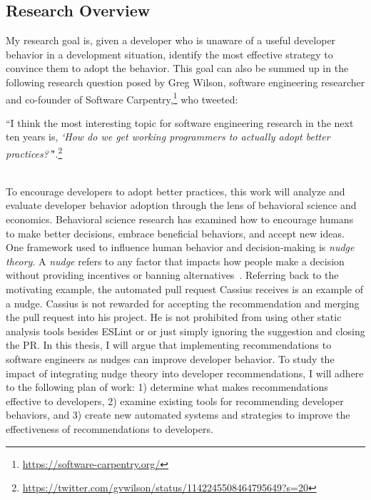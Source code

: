\subsection{Research Overview}

My research goal is, given a developer who is unaware of a useful developer behavior in a development situation, identify the most effective strategy to convince them to adopt the behavior. This goal can also be summed up in the following research question posed by Greg Wilson, software engineering researcher and co-founder of Software Carpentry,\footnote{\url{https://software-carpentry.org/}} who tweeted: \\

\begin{blockquote}
``I think the most interesting topic for software engineering research in the next ten years is, \textit{`How do we get working programmers to actually adopt better practices?'}".\footnote{\url{https://twitter.com/gvwilson/status/1142245508464795649?s=20}}
\end{blockquote} \\

To encourage developers to adopt better practices, this work will analyze and evaluate developer behavior adoption through the lens of behavioral science and economics. Behavioral science research has examined how to encourage humans to make better decisions, embrace beneficial behaviors, and accept new ideas. One framework used to influence human behavior and decision-making is \textit{nudge theory}. A \textit{nudge} refers to any factor that impacts how people make a decision without providing incentives or banning alternatives~\cite{sunstein2008nudge}. Referring back to the motivating example, the automated pull request Cassius receives is an example of a nudge. Cassius is not rewarded for accepting the recommendation and merging the pull request into his project. He is not prohibited from using other static analysis tools besides ESLint or or just simply ignoring the suggestion and closing the PR. In this thesis, I will argue that implementing recommendations to software engineers as nudges can improve developer behavior. To study the impact of integrating nudge theory into developer recommendations, I will adhere to the following plan of work: 1) determine what makes recommendations effective to developers, 2) examine existing tools for recommending developer behaviors, and 3) create new automated systems and strategies to improve the effectiveness of recommendations to developers.

